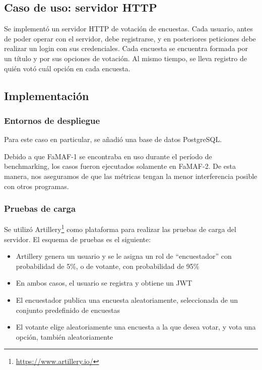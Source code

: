 \documentclass[11pt]{article}
\let\Oldsubsection\subsection
\renewcommand{\subsection}{\FloatBarrier\Oldsubsection}
\let\Oldsubsubsection\subsubsection
\renewcommand{\subsubsection}{\FloatBarrier\Oldsubsubsection}
\begin{document}
\subsection{Caso de uso: servidor HTTP}

Se implementó un servidor HTTP de votación de encuestas. Cada usuario, antes de poder operar con el servidor, debe registrarse, y en posteriores peticiones debe realizar un login con sus credenciales. Cada encuesta se encuentra formada por un título y por sus opciones de votación. Al mismo tiempo, se lleva registro de quién votó cuál opción en cada encuesta. 

\subsection{Implementación}


\subsubsection{Entornos de despliegue}

Para este caso en particular, se añadió una base de datos PostgreSQL.

Debido a que FaMAF-1 se encontraba en uso durante el período de benchmarking, los casos fueron ejecutados solamente en FaMAF-2. De esta manera, nos aseguramos de que las métricas tengan la menor interferencia posible con otros programas.

\subsubsection{Pruebas de carga}

Se utilizó Artillery\footnote{\url{https://www.artillery.io/}} como plataforma para realizar las pruebas de carga del servidor. El esquema de pruebas es el siguiente:

\begin{itemize}
    \item Artillery genera un usuario y se le asigna un rol de “encuestador” con probabilidad de 5\%, o de votante, con probabilidad de 95\%
    \item En ambos casos, el usuario se registra y obtiene un JWT
    \item El encuestador publica una encuesta aleatoriamente, seleccionada de un conjunto predefinido de encuestas
    \item El votante elige aleatoriamente una encuesta a la que desea votar, y vota una opción, también aleatoriamente
\end{itemize}
\end{document}
